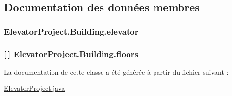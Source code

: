 \subsection{Documentation des données membres}
\hypertarget{classElevatorProject_1_1Building_a52a3e7eadfea5feeee5dd2193d6ea504}{
\subsubsection[{elevator}]{ Elevator\-Project.\-Building.\-elevator\hspace{0.3cm}{\ttfamily [package]}}}\label{classElevatorProject_1_1Building_a52a3e7eadfea5feeee5dd2193d6ea504}
\hypertarget{classElevatorProject_1_1Building_affa665538026d6acfa76b886e341169d}{
\subsubsection[{floors}]{ \mbox{[}$\,$\mbox{]} Elevator\-Project.\-Building.\-floors\hspace{0.3cm}{\ttfamily [package]}}}\label{classElevatorProject_1_1Building_affa665538026d6acfa76b886e341169d}


La documentation de cette classe a été générée à partir du fichier suivant \-:\begin{DoxyCompactItemize}
\item 
\hyperlink{ElevatorProject_8java}{Elevator\-Project.\-java}\end{DoxyCompactItemize}
